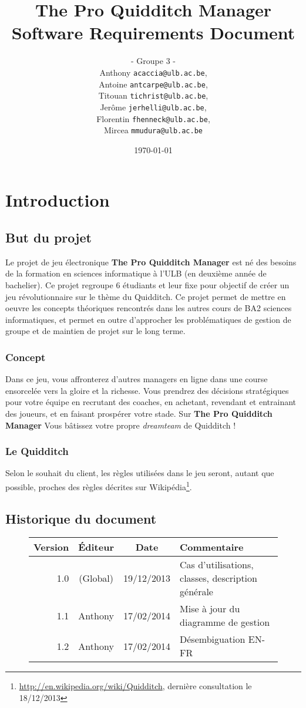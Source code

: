 \documentclass[a4paper, 11pt]{report}
\author{
- Groupe 3 -\\
Anthony \bsc{Caccia} \texttt{acaccia@ulb.ac.be},\\
Antoine \bsc{Carpentier} \texttt{antcarpe@ulb.ac.be},\\
Titouan \bsc{Christophe} \texttt{tichrist@ulb.ac.be},\\
Jerôme \bsc{Hellinckx} \texttt{jerhelli@ulb.ac.be},\\
Florentin \bsc{Hennecker} \texttt{fhenneck@ulb.ac.be},\\
Mircea \bsc{Mudura} \texttt{mmudura@ulb.ac.be}\\
}
\title{The Pro Quidditch Manager\\Software Requirements Document}
\date{\today}
\begin{document}
\maketitle
\tableofcontents

\chapter{Introduction}

\section{But du projet}
Le projet de jeu électronique \textbf{The Pro Quidditch Manager} est né des besoins de la formation
en sciences informatique à l'ULB (en deuxième année de bachelier). Ce projet regroupe 6 étudiants et leur fixe pour objectif de créer un jeu révolutionnaire sur le thème du Quidditch. Ce projet permet
de mettre en oeuvre les concepts théoriques rencontrés dans les autres cours de 
BA2 sciences informatiques, et permet en outre d'approcher les problématiques de 
gestion de groupe et de maintien de projet sur le long terme.

\subsection{Concept}
Dans ce jeu, vous affronterez d'autres \gls{manager}s en ligne dans une course ensorcelée
vers la gloire et la richesse. Vous prendrez des décisions stratégiques pour votre
équipe en recrutant des coaches, en achetant, revendant et entrainant des joueurs, et en faisant prospérer votre stade. 
Sur \textbf{The Pro Quidditch Manager} Vous bâtissez votre propre \textit{dreamteam} de Quidditch !

\subsection{Le Quidditch}
Selon le souhait du client, les règles utilisées dans le jeu seront, autant que possible, proches des règles décrites sur Wikipédia\footnote{\url{http://en.wikipedia.org/wiki/Quidditch}, dernière consultation le 18/12/2013}.

\section{Historique du document}
\begin{figure}[h!]
\centering
\begin{tabular}{| r | c | c | l |}
\hline
\textbf{Version} & \textbf{Éditeur} & \textbf{Date} & \textbf{Commentaire} \\
\hline
1.0 & (Global) & 19/12/2013 & Cas d'utilisations, classes, description générale\\
\hline
1.1 & Anthony & 17/02/2014 & Mise à jour du diagramme de gestion\\
\hline
1.2 & Anthony & 17/02/2014 & Désembiguation EN-FR\\
\hline
\end{tabular}
\end{figure}
\end{document}
